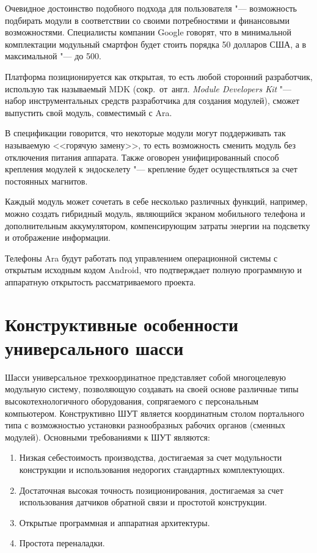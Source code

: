 Очевидное достоинство подобного подхода для пользователя "--- возможность подбирать модули в соответствии со своими потребностями и финансовыми возможностями. Специалисты компании Google говорят, что в минимальной комплектации модульный смартфон будет стоить порядка 50 долларов США, а в максимальной "--- до 500.

Платформа позиционируется как открытая, то есть любой сторонний разработчик, использую так называемый MDK (сокр.~от~англ. \textit{Module Developers Kit} "--- набор инструментальных средств разработчика для создания модулей), сможет выпустить свой модуль, совместимый с Ara.

В спецификации говорится, что некоторые модули могут поддерживать так называемую <<горячую замену>>, то есть возможность сменить модуль без отключения питания аппарата. Также оговорен унифицированный способ крепления модулей к эндоскелету "--- крепление будет осуществляться за счет постоянных магнитов.

Каждый модуль может сочетать в себе несколько различных функций, например, можно создать гибридный модуль, являющийся экраном мобильного телефона и дополнительным аккумулятором, компенсирующим затраты энергии на подсветку и отображение информации.

Телефоны Ara будут работать под управлением операционной системы с открытым исходным кодом Android, что подтверждает полную программную и аппаратную открытость рассматриваемого проекта.

\section{Конструктивные особенности универсального шасси}

Шасси универсальное трехкоординатное представляет собой многоцелевую модульную систему, позволяющую создавать на своей основе различные типы высокотехнологичного оборудования, сопрягаемого с персональным компьютером. Конструктивно ШУТ является координатным столом портального типа с возможностью установки разнообразных рабочих органов (сменных модулей). Основными требованиями к ШУТ являются:

\begin{enumerate}
	\item Низкая себестоимость производства, достигаемая за счет модульности конструкции и использования недорогих стандартных комплектующих.
	
	\item Достаточная высокая точность позиционирования, достигаемая за счет использования датчиков обратной связи и простотой конструкции.
	
	\item Открытые программная и аппаратная архитектуры.
	
	\item Простота переналадки.
\end{enumerate}


